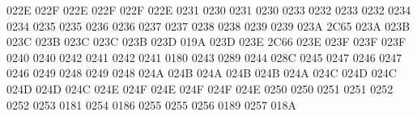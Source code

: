 \setcclcucx 022E 022F 022E %
\setcclcucx 022F 022F 022E %
 0231 0230 %
 0231 0230 %
 0233 0232 %
 0233 0232 %
 0234 0234 %
 0235 0235 %
 0236 0236 %
 0237 0237 %
 0238 0238 %
 0239 0239 %
\setcclcucx 023A 2C65 023A %
\setcclcucx 023B 023C 023B %
\setcclcucx 023C 023C 023B %
\setcclcucx 023D 019A 023D %
\setcclcucx 023E 2C66 023E %
\setcclcucx 023F 023F 023F %
 0240 0240 %
 0242 0241 %
 0242 0241 %
 0180 0243 %
 0289 0244 %
 028C 0245 %
 0247 0246 %
 0247 0246 %
 0249 0248 %
 0249 0248 %
\setcclcucx 024A 024B 024A %
\setcclcucx 024B 024B 024A %
\setcclcucx 024C 024D 024C %
\setcclcucx 024D 024D 024C %
\setcclcucx 024E 024F 024E %
\setcclcucx 024F 024F 024E %
 0250 0250 %
 0251 0251 %
 0252 0252 %
 0253 0181 %
 0254 0186 %
 0255 0255 %
 0256 0189 %
 0257 018A %
